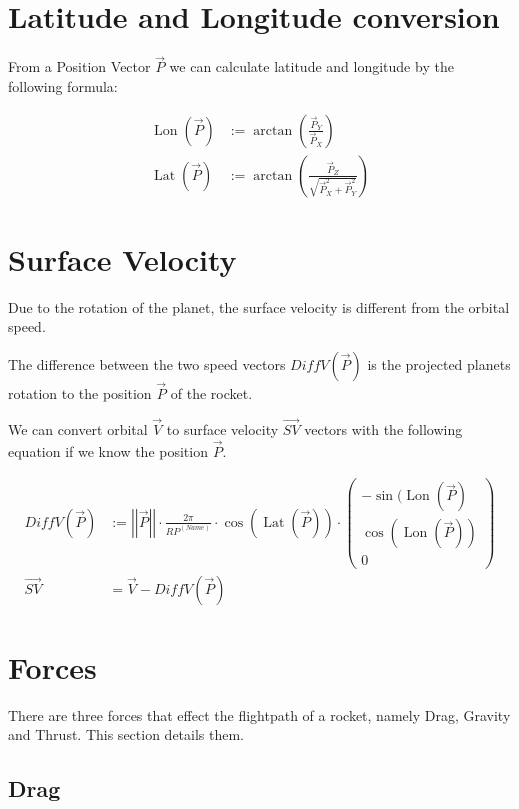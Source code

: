 \documentclass[11pt]{article}
\newcommand{\oa}[1]{\overrightarrow{#1}}
\newcommand{\Pos}{\oa{P}}
\newcommand{\Vel}{\oa{V}}
\newcommand{\absvec}[1]{\left|\left|{#1}\right|\right|}
\DeclareMathOperator{\Lat}{Lat}
\DeclareMathOperator{\Lon}{Lon}
\begin{document}
\section{Latitude and Longitude conversion}

From a Position Vector $\Pos$ we can calculate 
latitude and  longitude by the following formula:

\begin{align}
  \Lon(\Pos) &:= \arctan\left(\frac{\Pos_Y}{\Pos_X}\right)\\
  \Lat(\Pos) &:= \arctan\left(\frac{\Pos_Z}{\sqrt{\Pos_X^2+\Pos_Y^2}}\right)
\end{align}

\section{Surface Velocity}

Due to the rotation of the planet, the 
surface velocity is different from the orbital speed.

The difference between the two speed vectors $DiffV(\Pos)$ is the
projected planets rotation to the position $\Pos$ of the rocket.

We can convert orbital $\Vel$ to surface velocity $\oa{SV}$
vectors with the following equation if we know the position $\Pos$.

\begin{align}
  DiffV(\Pos) &:= \absvec{\Pos} \cdot \frac{2 \pi}{RP^{(Name)}} \cdot \cos\left(\Lat\left(\Pos\right)\right)\cdot\left(\begin{smallmatrix}-\sin(\Lon(\Pos)\\\cos(\Lon(\Pos))\\0\end{smallmatrix}\right)\nonumber\\
  \oa{SV} &= \Vel - DiffV(\Pos)
\end{align}

\section{Forces}

There are three forces that effect the flightpath of a rocket, namely
Drag, Gravity and Thrust. This section details them.

\subsection{Drag}
\end{document}
